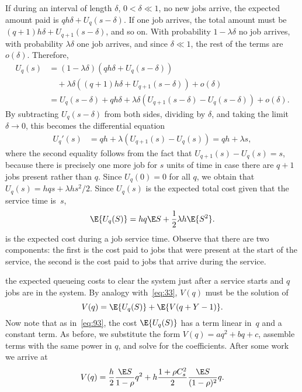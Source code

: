 If during an interval of length $\delta$, $0<\delta\ll 1$, no new jobs arrive, the expected amount paid is $qh\delta +U_{q}(s-\delta)$.
If one job arrives, the total amount must be $(q+1)h\delta + U_{q+1}(s-\delta)$, and so on.
With probability $1-\lambda \delta$ no job arrives, with probability $\lambda \delta$ one job arrives, and since $\delta\ll 1$, the rest of the terms are $o(\delta)$.
Therefore,
\begin{align*}
  U_{q}(s)
  &=  (1-\lambda \delta)\left(qh\delta + U_{q}(s-\delta)\right) \\
  &\quad + \lambda \delta \left((q+1) h \delta + U_{q+1}(s-\delta)\right) + o(\delta) \\
  &=  U_{q}(s-\delta) + qh\delta + \lambda \delta (U_{q+1}(s-\delta) - U_{q}(s-\delta)) + o(\delta).
\end{align*}
By subtracting $U_{q}(s-\delta)$ from both sides, dividing by $\delta$, and taking the limit $\delta \to 0$, this becomes
the differential equation
\begin{align*}
  U_{q}'(s)  &=   qh + \lambda  (U_{q+1}(s) - U_{q}(s)) = q h + \lambda s,
\end{align*}
where the second equality follows from the fact that $U_{q+1}(s) - U_{q}(s) = s$, because there is precisely one more job for $s$ units of time in case there are $q+1$ jobs present rather than $q$. Since $U_{q}(0) = 0$ for all $q$,
we obtain that $U_{q}(s)= hq s + \lambda h s^2/2$.
Since $U_{q}(s)$ is the expected total cost given that the service time is~$s$,
\begin{equation*}
\E{U_{q}(S)}  =  h q \E S +  \frac 12 \lambda h \E{S^2}.
\end{equation*}
is the expected cost during a job service time. Observe that there are two components: the first is the cost paid to jobs that were present at the start of the service, the second is the cost paid to jobs that arrive during the service.


 the expected queueing costs to clear the system just after a service starts and  $q$ jobs are in the system.
By analogy with~\cref{eq:33}, $V(q)$ must be the solution of
\begin{equation}  \label{eq:98}
  V(q) = \E{U_{q}(S)} + \E{V(q+Y-1)}.
\end{equation}
Now note that as in~\cref{eq:93}, the cost $\E{U_{q}(S)}$ has a term linear in~$q$ and a constant term.
As before, we substitute the form $V(q) = aq^2 + bq+c$, assemble terms with the same power in $q$, and solve for the coefficients.
After some work we arrive at
\begin{align*}
  V(q) = \frac{h}{2}\frac{\E S}{1-\rho} q^2 + h  \frac{ 1+ \rho C_s^2}2 \frac{\E S}{(1-\rho)^2} q.
\end{align*}

